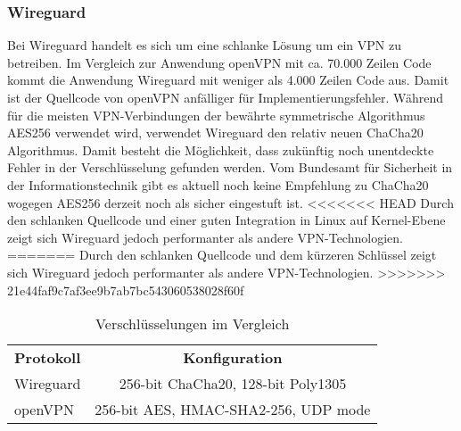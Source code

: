 \newpage
\subsubsection{Wireguard}

Bei Wireguard handelt es sich um eine schlanke L\"osung um ein \ac{VPN} zu betreiben. Im Vergleich zur Anwendung openVPN mit ca. 70.000 Zeilen Code kommt die Anwendung Wireguard mit weniger als 4.000 Zeilen Code aus. 
Damit ist der Quellcode von openVPN anf\"alliger f\"ur Implementierungsfehler. W\"ahrend f\"ur die meisten VPN-Verbindungen der bew\"ahrte symmetrische Algorithmus AES256 verwendet wird, verwendet Wireguard den relativ neuen ChaCha20 Algorithmus. Damit besteht die M\"oglichkeit, dass zuk\"unftig noch unentdeckte Fehler in der Verschl\"usselung gefunden werden. Vom Bundesamt f\"ur Sicherheit in der Informationstechnik gibt es aktuell noch keine Empfehlung zu ChaCha20 wogegen AES256 derzeit noch als sicher eingestuft ist.  
<<<<<<< HEAD
Durch den schlanken Quellcode und einer guten Integration in Linux auf Kernel-Ebene zeigt sich Wireguard jedoch performanter als andere VPN-Technologien.   
=======
Durch den schlanken Quellcode und dem k\"urzeren Schl\"ussel zeigt sich Wireguard jedoch performanter als andere VPN-Technologien.   
>>>>>>> 21e44faf9c7af3ee9b7ab7bc543060538028f60f

\begin{table}[ht]
   \begin{center}
      \begin{tabular}{lc}\toprule
         \textbf{Protokoll}	&\textbf{Konfiguration} \\ 	
         Wireguard	& 256-bit ChaCha20, 128-bit Poly1305 \\
         openVPN	& 256-bit AES, HMAC-SHA2-256, UDP mode \\
      \end{tabular}
   \end{center}
   \caption{Verschlüsselungen im Vergleich}
\end{table}

